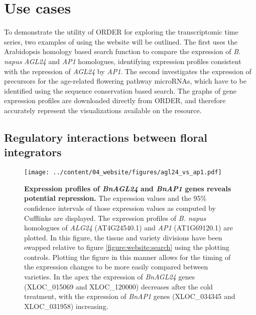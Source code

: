 \documentclass[12pt,]{book}
\begin{document}
\section{Use cases}\label{use-cases}

To demonstrate the utility of ORDER for exploring the transcriptomic
time series, two examples of using the website will be outlined. The
first uses the Arabidopsis homology based search function to compare the
expression of \emph{B. napus} \emph{AGL24} and \emph{AP1} homologues,
identifying expression profiles consistent with the repression of
\emph{AGL24} by \emph{AP1}. The second investigates the expression of
precursors for the age-related flowering pathway microRNAs, which have
to be identified using the sequence conservation based search. The
graphs of gene expression profiles are downloaded directly from ORDER,
and therefore accurately represent the visualizations available on the
resource.

\subsection{Regulatory interactions between floral
integrators}\label{regulatory-interactions-between-floral-integrators}

\begin{figure}[htbp]
\centering
\texttt{[image: ../content/04\_website/figures/agl24\_vs\_ap1.pdf]}
\caption{\textbf{Expression profiles of \emph{BnAGL24} and \emph{BnAP1}
genes reveals potential repression.} The expression values and the 95\%
confidence intervals of those expression values as computed by Cufflinks
are displayed. The expression profiles of \emph{B. napus} homologues of
\emph{ALG24} (AT4G24540.1) and \emph{AP1} (AT1G69120.1) are plotted. In
this figure, the tissue and variety divisions have been swapped relative
to figure \ref{figure:website:search} using the plotting controls.
Plotting the figure in this manner allows for the timing of the
expression changes to be more easily compared between varieties. In the
apex the expression of \emph{BnAGL24} genes (XLOC\_015069 and
XLOC\_120000) decreases after the cold treatment, with the expression of
\emph{BnAP1} genes (XLOC\_034345 and XLOC\_031958)
increasing.}\label{figure:winter:agl24ap1}
\end{figure}
\end{document}
